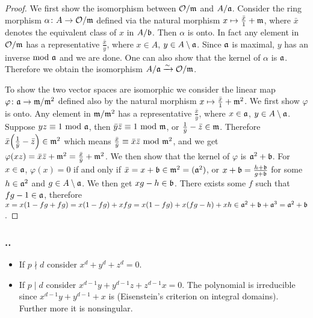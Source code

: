\documentclass{note}
\newcounter{exercise}[section]
\newcommand{\Ex}{%
    \stepcounter{exercise}%
    \subsubsection*{\thesection.\arabic{exercise}.}%
}
\newcommand{\divides}{\mid}
\newcommand{\ndivide}{\nmid}
\begin{document}
\begin{proof}
  We first show the isomorphism between $\mathcal{O}/\mathfrak{m}$ and $A/\mathfrak{a}$.
  Consider the ring morphism $\alpha\colon A \to \mathcal{O}/\mathfrak{m}$ defined via
  the natural morphism $x \mapsto \frac{\bar{x}}{1}+\mathfrak{m}$, where $\bar{x}$
  denotes the equivalent class of $x$ in $A/\mathfrak{b}$. Then $\alpha$ is onto. In
  fact any element in $\mathcal{O}/\mathfrak{m}$ has a representative
  $\frac{\bar{x}}{\bar{y}}$, where $x\in A$, $y \in A\setminus\mathfrak{a}$. Since
  $\mathfrak{a}$ is maximal, $y$ has an inverse $\!\mathop{}\mathrm{mod}\ \mathfrak{a}$ and we are done.
  One can also show that the kernel of $\alpha$ is $\mathfrak{a}$. Therefore we obtain
  the isomorphism $A/\mathfrak{a} \xrightarrow{\sim} \mathcal{O}/\mathfrak{m}$.

  To show the two vector spaces are isomorphic we consider the linear map
  $\varphi\colon \mathfrak{a} \to \mathfrak{m}/\mathfrak{m}^2$ defined also by the natural
  morphism $x\mapsto\frac{\bar{x}}{1}+\mathfrak{m}^2$. We first show $\varphi$ is onto.
  Any element in $\mathfrak{m}/\mathfrak{m}^2$ has a representative
  $\frac{\bar{x}}{\bar{y}}$, where $x \in \mathfrak{a}$, $y \in A\setminus\mathfrak{a}$.
  Suppose $yz \equiv 1 \mathop{}\mathrm{mod}\  \mathfrak{a}$, then $\bar{y}\bar{z} \equiv 1 \mathop{}\mathrm{mod}\ 
  \mathfrak{m}$, or $\frac{1}{\bar{y}}-\bar{z} \in \mathfrak{m}$. Therefore
  $\bar{x}\left(\frac{1}{\bar{y}}-\bar{z}\right) \in \ideal{m}^2$ which means
  $\frac{\bar{x}}{\bar{y}} \equiv \bar{x}\bar{z} \mathop{}\mathrm{mod}\  \mathfrak{m}^2$, and we get
  $\varphi(xz) = \bar{x}\bar{z}+\mathfrak{m}^2 = \frac{\bar{x}}{\bar{y}}+\mathfrak{m}^2$.
  We then show that the kernel of $\varphi$ is $\mathfrak{a}^2+\mathfrak{b}$. For $x \in
  \mathfrak{a}$, $\varphi(x) = 0$ if and only if $\bar{x} = x+\mathfrak{b} \in \mathfrak{m}^2
  = (\mathfrak{a}^2)$, or $x+\mathfrak{b} = \frac{h+\mathfrak{b}}{g+\mathfrak{b}}$ for some
  $h\in\mathfrak{a}^2$ and $g\in A\setminus\mathfrak{a}$. We then get $xg - h \in
  \mathfrak{b}$. There exists some $f$ such that $fg-1\in \mathfrak{a}$, therefore $x =
  x(1-fg+fg) = x(1-fg) + xfg = x(1-fg) + x(fg - h) + xh \in \mathfrak{a}^2 + \mathfrak{b}
  + \mathfrak{a}^3 = \mathfrak{a}^2+\mathfrak{b}$.
\end{proof}



\setcounter{exercise}{4}

\Ex
\begin{itemize}
  \item If $p\ndivide d$ consider $x^d + y^d + z^d = 0$.
  \item If $p\divides d$ consider $x^{d-1}y + y^{d-1}z + z^{d-1}x = 0$. The
        polynomial is irreducible since $x^{d-1}y + y^{d-1} + x$ is (Eisenstein's
        criterion on integral domains). Further more it is nonsingular.
\end{itemize}
\end{document}
